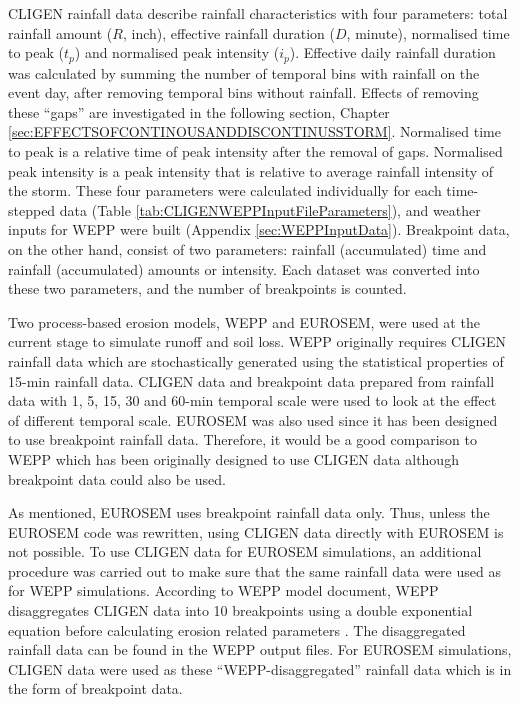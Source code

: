CLIGEN rainfall data describe rainfall characteristics with four parameters:
total rainfall amount ($R$, inch), effective rainfall duration ($D$, minute),
normalised time to peak ($t_p$) and normalised peak intensity ($i_p$). Effective
daily rainfall duration was calculated by summing the number of temporal bins
with rainfall on the event day, after removing temporal bins without rainfall.
Effects of removing these ``gaps'' are investigated in the following section,
Chapter \ref{sec:EFFECTSOFCONTINOUSANDDISCONTINUSSTORM}. Normalised time to
peak is a relative time of peak intensity after the removal of gaps.
Normalised peak intensity is a peak intensity that is relative to average
rainfall intensity of the storm. These four parameters were calculated
individually for each time-stepped data (Table
\ref{tab:CLIGENWEPPInputFileParameters}), and weather inputs for WEPP were
built (Appendix \ref{sec:WEPPInputData}). Breakpoint data, on the other hand,
consist of two parameters: rainfall (accumulated) time and rainfall
(accumulated) amounts or intensity. Each dataset was converted into these two
parameters, and the number of breakpoints is counted.

Two process-based erosion models, WEPP and EUROSEM, were used at the current
stage to simulate runoff and soil loss. WEPP originally requires CLIGEN rainfall
data which are stochastically generated using the statistical properties of
15-min rainfall data. CLIGEN data and breakpoint data prepared from rainfall
data with 1, 5, 15, 30 and 60-min temporal scale were used to look at the effect
of different temporal scale. EUROSEM was also used since it has been
designed to use breakpoint rainfall data. Therefore, it would be a good
comparison to WEPP which has been originally designed to use CLIGEN data
although breakpoint data could also be used.

As mentioned, EUROSEM uses breakpoint rainfall data only. Thus, unless the
EUROSEM code was rewritten, using CLIGEN data directly with EUROSEM is not
possible. To use CLIGEN data for EUROSEM simulations, an additional
procedure was carried out to make sure that the same rainfall data were used
as for WEPP simulations. According to WEPP model document, WEPP disaggregates
CLIGEN data into 10 breakpoints using a double exponential equation before
calculating erosion related parameters \citep{flanagan1995-usda}. The
disaggregated rainfall data can be found in the WEPP output files. For EUROSEM
simulations, CLIGEN data were used as these ``WEPP-disaggregated'' rainfall
data which is in the form of breakpoint data.

